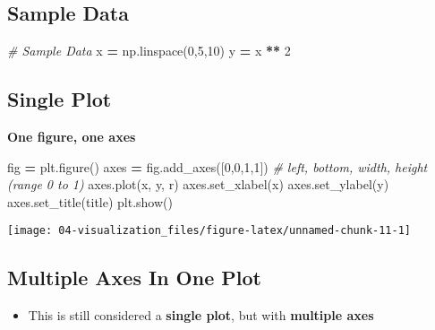 \documentclass[
]{book}
\newenvironment{Shaded}{\begin{snugshade}}{\end{snugshade}}
\newcommand{\CommentTok}[1]{\textcolor[rgb]{0.37,0.37,0.37}{\textit{#1}}}
\newcommand{\DecValTok}[1]{\textcolor[rgb]{0.06,0.06,0.06}{#1}}
\newcommand{\NormalTok}[1]{#1}
\newcommand{\OperatorTok}[1]{\textcolor[rgb]{0.43,0.43,0.43}{\textbf{#1}}}
\newcommand{\StringTok}[1]{\textcolor[rgb]{0.5,0.5,0.5}{#1}}
\providecommand{\tightlist}{%
  \setlength{\itemsep}{0pt}\setlength{\parskip}{0pt}}
\begin{document}
\hypertarget{sample-data-18}{%
\subsection{Sample Data}\label{sample-data-18}}

\begin{Shaded}
\begin{Highlighting}[]
\CommentTok{\# Sample Data}
\NormalTok{x }\OperatorTok{=}\NormalTok{ np.linspace(}\DecValTok{0}\NormalTok{,}\DecValTok{5}\NormalTok{,}\DecValTok{10}\NormalTok{)}
\NormalTok{y }\OperatorTok{=}\NormalTok{ x }\OperatorTok{**} \DecValTok{2}
\end{Highlighting}
\end{Shaded}

\hypertarget{single-plot-1}{%
\subsection{Single Plot}\label{single-plot-1}}

\textbf{One figure, one axes}

\begin{Shaded}
\begin{Highlighting}[]
\NormalTok{fig }\OperatorTok{=}\NormalTok{ plt.figure()}
\NormalTok{axes }\OperatorTok{=}\NormalTok{ fig.add\_axes([}\DecValTok{0}\NormalTok{,}\DecValTok{0}\NormalTok{,}\DecValTok{1}\NormalTok{,}\DecValTok{1}\NormalTok{]) }\CommentTok{\# left, bottom, width, height (range 0 to 1)}
\NormalTok{axes.plot(x, y, }\StringTok{\textquotesingle{}r\textquotesingle{}}\NormalTok{)}
\NormalTok{axes.set\_xlabel(}\StringTok{\textquotesingle{}x\textquotesingle{}}\NormalTok{)}
\NormalTok{axes.set\_ylabel(}\StringTok{\textquotesingle{}y\textquotesingle{}}\NormalTok{)}
\NormalTok{axes.set\_title(}\StringTok{\textquotesingle{}title\textquotesingle{}}\NormalTok{)}
\NormalTok{plt.show()}
\end{Highlighting}
\end{Shaded}

\texttt{[image: 04-visualization\_files/figure-latex/unnamed-chunk-11-1]}

\hypertarget{multiple-axes-in-one-plot}{%
\subsection{Multiple Axes In One Plot}\label{multiple-axes-in-one-plot}}

\begin{itemize}
\tightlist
\item
  This is still considered a \textbf{single plot}, but with \textbf{multiple axes}
\end{itemize}
\end{document}
